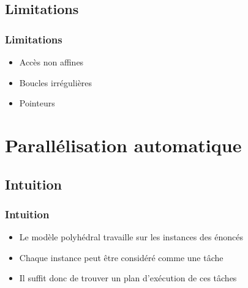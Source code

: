 \documentclass{beamer}
\begin{document}
\subsection{Limitations}
\begin{frame}
\frametitle{Limitations}
\begin{itemize}
\item Accès non affines
\item Boucles irrégulières
\item Pointeurs
\end{itemize}
\end{frame}

\section{Parallélisation automatique}
\subsection{Intuition}
\begin{frame}
\frametitle{Intuition}
\begin{itemize}
\item Le modèle polyhédral travaille sur les instances des énoncés
\item<2-> Chaque instance peut être considéré comme une tâche
\item<3-> Il suffit donc de trouver un plan d'exécution de ces tâches
\end{itemize}
\end{frame}
\end{document}

